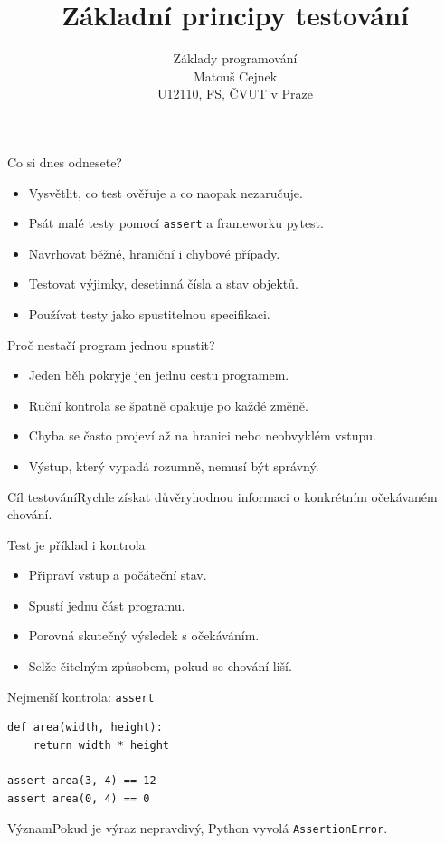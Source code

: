 \documentclass[aspectratio=169]{beamer}
\title{Základní principy testování}
\subtitle{Základy programování\\Matouš Cejnek\\U12110, FS, ČVUT v Praze}
\author{}\institute{}\date{}
\begin{document}
\begin{frame}\clearpage\thispagestyle{empty}\titlepage\end{frame}

\begin{frame}{Co si dnes odnesete?}
\begin{itemize}
\item Vysvětlit, co test ověřuje a co naopak nezaručuje.
\item Psát malé testy pomocí \texttt{assert} a frameworku pytest.
\item Navrhovat běžné, hraniční i chybové případy.
\item Testovat výjimky, desetinná čísla a stav objektů.
\item Používat testy jako spustitelnou specifikaci.
\end{itemize}
\end{frame}

\begin{frame}{Proč nestačí program jednou spustit?}
\begin{itemize}
\item Jeden běh pokryje jen jednu cestu programem.
\item Ruční kontrola se špatně opakuje po každé změně.
\item Chyba se často projeví až na hranici nebo neobvyklém vstupu.
\item Výstup, který vypadá rozumně, nemusí být správný.
\end{itemize}
\begin{block}{Cíl testování}Rychle získat důvěryhodnou informaci o konkrétním očekávaném chování.\end{block}
\end{frame}

\begin{frame}{Test je příklad i kontrola}
\begin{itemize}
\item Připraví vstup a počáteční stav.
\item Spustí jednu část programu.
\item Porovná skutečný výsledek s očekáváním.
\item Selže čitelným způsobem, pokud se chování liší.
\end{itemize}
\end{frame}

\begin{frame}[fragile]{Nejmenší kontrola: \texttt{assert}}
\begin{lstlisting}[style=python]
def area(width, height):
    return width * height

assert area(3, 4) == 12
assert area(0, 4) == 0
\end{lstlisting}
\begin{block}{Význam}Pokud je výraz nepravdivý, Python vyvolá \texttt{AssertionError}.\end{block}
\end{frame}
\end{document}
